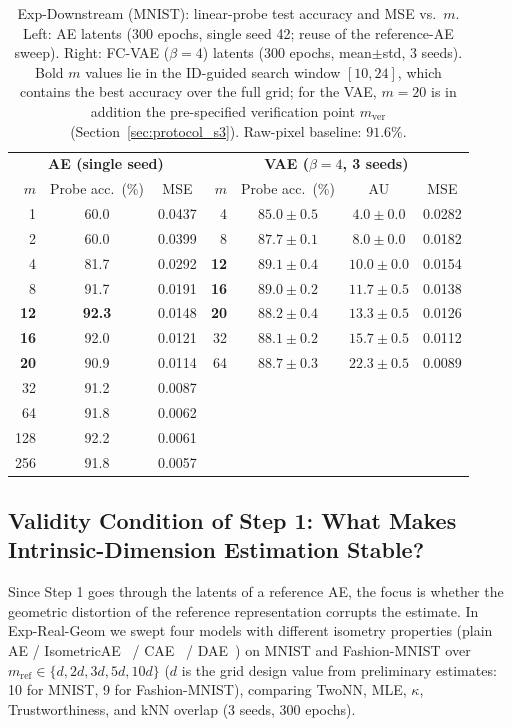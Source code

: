 \documentclass[make,article,submit,pdftex,moreauthors]{Definitions/mdpi}
\newcommand{\kap}{\kappa}
\begin{document}
\begin{table}[H]
\caption{Exp-Downstream (MNIST): linear-probe test accuracy and MSE vs.\
$m$. Left: AE latents (300 epochs, single seed 42; reuse of the
reference-AE sweep). Right: FC-VAE ($\beta = 4$) latents (300 epochs,
mean$\pm$std, 3 seeds). Bold $m$ values lie in the ID-guided search window
$[10, 24]$, which contains the best accuracy over the full grid; for the
VAE, $m = 20$ is in addition the pre-specified verification point
$m_{\mathrm{ver}}$ (Section~\ref{sec:protocol_s3}).
Raw-pixel baseline: $91.6\%$.}
\label{tab:downstream}
\small
\begin{tabular}{r cc | r ccc}
\toprule
\multicolumn{3}{c|}{\textbf{AE (single seed)}} & \multicolumn{4}{c}{\textbf{VAE ($\beta = 4$, 3 seeds)}} \\
$m$ & Probe acc.\ (\%) & MSE & $m$ & Probe acc.\ (\%) & AU & MSE \\
\midrule
1 & 60.0 & 0.0437 & 4 & $85.0 \pm 0.5$ & $4.0 \pm 0.0$ & 0.0282 \\
2 & 60.0 & 0.0399 & 8 & $87.7 \pm 0.1$ & $8.0 \pm 0.0$ & 0.0182 \\
4 & 81.7 & 0.0292 & \textbf{12} & $\boldsymbol{89.1 \pm 0.4}$ & $10.0 \pm 0.0$ & 0.0154 \\
8 & 91.7 & 0.0191 & \textbf{16} & $89.0 \pm 0.2$ & $11.7 \pm 0.5$ & 0.0138 \\
\textbf{12} & \textbf{92.3} & 0.0148 & \textbf{20} & $88.2 \pm 0.4$ & $13.3 \pm 0.5$ & 0.0126 \\
\textbf{16} & 92.0 & 0.0121 & 32 & $88.1 \pm 0.2$ & $15.7 \pm 0.5$ & 0.0112 \\
\textbf{20} & 90.9 & 0.0114 & 64 & $88.7 \pm 0.3$ & $22.3 \pm 0.5$ & 0.0089 \\
32 & 91.2 & 0.0087 &  & & & \\
64 & 91.8 & 0.0062 &  & & & \\
128 & 92.2 & 0.0061 &  & & & \\
256 & 91.8 & 0.0057 &  & & & \\
\bottomrule
\end{tabular}
\end{table}

\subsection{Validity Condition of Step 1: What Makes Intrinsic-Dimension Estimation Stable?}\label{sec:exp_real_geom}

Since Step 1 goes through the latents of a reference AE, the focus is
whether the geometric distortion of the reference representation corrupts
the estimate.
In Exp-Real-Geom we swept four models with different isometry properties
(plain AE / IsometricAE~\cite{kato2020rdae} / CAE~\cite{rifai2011cae} /
DAE~\cite{alain2014dae}) on MNIST and Fashion-MNIST over
$m_{\mathrm{ref}} \in \{d, 2d, 3d, 5d, 10d\}$
($d$ is the grid design value from preliminary estimates: 10 for MNIST,
9 for Fashion-MNIST), comparing TwoNN, MLE,
$\kap$, Trustworthiness, and kNN overlap (3 seeds, 300 epochs).
\end{document}
